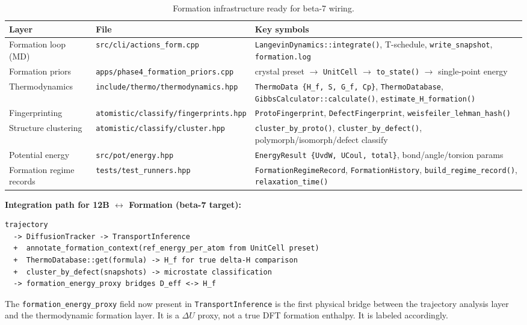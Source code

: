 \documentclass[11pt,a4paper]{article}
\begin{document}
\begin{table}[h!]
\centering
\begin{tabularx}{\linewidth}{llX}
\toprule
\textbf{Layer} & \textbf{File} & \textbf{Key symbols} \\
\midrule
Formation loop (MD) & \texttt{src/cli/actions\_form.cpp} & \texttt{LangevinDynamics::integrate()}, T-schedule, \texttt{write\_snapshot}, \texttt{formation.log} \\
Formation priors & \texttt{apps/phase4\_formation\_priors.cpp} & crystal preset $\to$ \texttt{UnitCell} $\to$ \texttt{to\_state()} $\to$ single-point energy \\
Thermodynamics & \texttt{include/thermo/thermodynamics.hpp} & \texttt{ThermoData \{H\_f, S, G\_f, Cp\}}, \texttt{ThermoDatabase}, \texttt{GibbsCalculator::calculate()}, \texttt{estimate\_H\_formation()} \\
Fingerprinting & \texttt{atomistic/classify/fingerprints.hpp} & \texttt{ProtoFingerprint}, \texttt{DefectFingerprint}, \texttt{weisfeiler\_lehman\_hash()} \\
Structure clustering & \texttt{atomistic/classify/cluster.hpp} & \texttt{cluster\_by\_proto()}, \texttt{cluster\_by\_defect()}, polymorph/isomorph/defect classify \\
Potential energy & \texttt{src/pot/energy.hpp} & \texttt{EnergyResult \{UvdW, UCoul, total\}}, bond/angle/torsion params \\
Formation regime records & \texttt{tests/test\_runners.hpp} & \texttt{FormationRegimeRecord}, \texttt{FormationHistory}, \texttt{build\_regime\_record()}, \texttt{relaxation\_time()} \\
\bottomrule
\end{tabularx}
\caption{Formation infrastructure ready for beta-7 wiring.}
\end{table}

\textbf{Integration path for 12B $\leftrightarrow$ Formation (beta-7 target):}

\begin{lstlisting}
trajectory
  -> DiffusionTracker -> TransportInference
  +  annotate_formation_context(ref_energy_per_atom from UnitCell preset)
  +  ThermoDatabase::get(formula) -> H_f for true delta-H comparison
  +  cluster_by_defect(snapshots) -> microstate classification
  -> formation_energy_proxy bridges D_eff <-> H_f
\end{lstlisting}

The \texttt{formation\_energy\_proxy} field now present in \texttt{TransportInference} is the
first physical bridge between the trajectory analysis layer and the thermodynamic formation
layer. It is a $\Delta U$ proxy, not a true DFT formation enthalpy. It is labeled accordingly.
\end{document}
